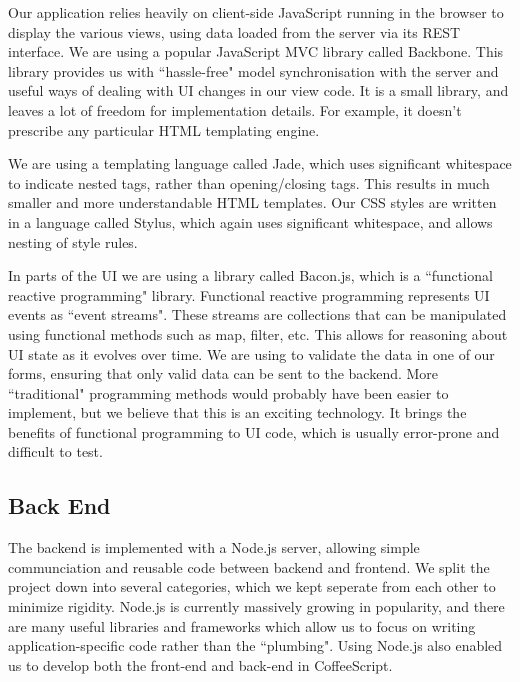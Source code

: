 \documentclass[11pt]{article}
\begin{document}
Our application relies heavily on client-side JavaScript running in the browser to display the various views, using data loaded from the server via its REST interface.
We are using a popular JavaScript MVC library called Backbone. This library provides us with ``hassle-free" model synchronisation with the server and useful ways of dealing with UI changes in our view code. It is a small library, and leaves a lot of freedom for implementation details. For example, it doesn't prescribe any particular HTML templating engine.

We are using a templating language called Jade, which uses significant whitespace to indicate nested tags, rather than opening/closing tags. This results in much smaller and more understandable HTML templates. Our CSS styles are written in a language called Stylus, which again uses significant whitespace, and allows nesting of style rules.

In parts of the UI we are using a library called Bacon.js, which is a ``functional reactive programming" library. Functional reactive programming represents UI events as ``event streams". These streams are collections that can be manipulated using functional methods such as map, filter, etc. This allows for reasoning about UI state as it evolves over time. We are using to validate the data in one of our forms, ensuring that only valid data can be sent to the backend. More ``traditional" programming methods would probably have been easier to implement, but we believe that this is an exciting technology. It brings the benefits of functional programming to UI code, which is usually error-prone and difficult to test.

\subsection {Back End}

The backend is implemented with a Node.js server, allowing simple communciation and reusable code between backend and frontend. We split the project down into several categories, which we kept seperate from each other to minimize rigidity. Node.js is currently massively growing in popularity, and there are many useful libraries and frameworks which allow us to focus on writing application-specific code rather than the ``plumbing". Using Node.js also enabled us to develop both the front-end and back-end in CoffeeScript.
\end{document}
